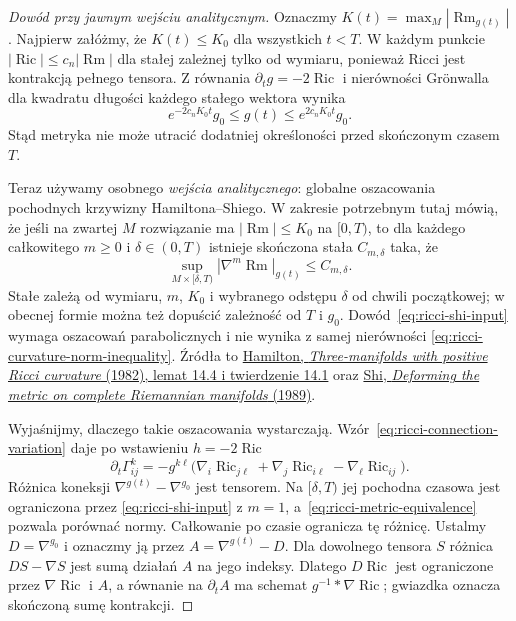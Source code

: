 \begin{proof}[Dowód przy jawnym wejściu analitycznym]
Oznaczmy
$K(t)=\max_M|\operatorname{Rm}_{g(t)}|$.
Najpierw załóżmy, że
$K(t)\leq K_0$ dla wszystkich $t<T$.
W każdym punkcie $|\operatorname{Ric}|
\leq c_n|\operatorname{Rm}|$ dla stałej zależnej
tylko od wymiaru, ponieważ Ricci jest kontrakcją
pełnego tensora. Z równania $\partial_tg=-2\operatorname{Ric}$
i nierówności Grönwalla dla kwadratu długości
każdego stałego wektora wynika
\begin{equation}\label{eq:ricci-metric-equivalence}
 e^{-2c_nK_0t}g_0
 \leq g(t)\leq e^{2c_nK_0t}g_0.
\end{equation}
Stąd metryka nie może utracić dodatniej określoności
przed skończonym czasem $T$.

Teraz używamy osobnego \emph{wejścia analitycznego}:
globalne oszacowania pochodnych krzywizny
Hamiltona--Shiego. W zakresie potrzebnym tutaj mówią,
że jeśli na zwartej $M$ rozwiązanie ma
$|\operatorname{Rm}|\leq K_0$ na $[0,T)$, to dla
każdego całkowitego $m\geq0$ i $\delta\in(0,T)$
istnieje skończona stała $C_{m,\delta}$ taka, że
\begin{equation}\label{eq:ricci-shi-input}
 \sup_{M\times[\delta,T)}
   |\nabla^m\operatorname{Rm}|_{g(t)}
   \leq C_{m,\delta}.
\end{equation}
Stałe zależą od wymiaru, $m$, $K_0$ i wybranego
odstępu $\delta$ od chwili początkowej; w obecnej
formie można też dopuścić zależność od $T$
i $g_0$. Dowód~\eqref{eq:ricci-shi-input}
wymaga oszacowań parabolicznych i nie wynika
z samej nierówności
\eqref{eq:ricci-curvature-norm-inequality}.
Źródła to
\href{https://projecteuclid.org/journals/journal-of-differential-geometry/volume-17/issue-2/Three-manifolds-with-positive-Ricci-curvature/10.4310/jdg/1214436922.pdf}
{Hamilton, \emph{Three-manifolds with positive Ricci
curvature} (1982), lemat 14.4 i twierdzenie 14.1}
oraz
\href{https://doi.org/10.4310/jdg/1214443292}
{Shi, \emph{Deforming the metric on complete
Riemannian manifolds} (1989)}.

Wyjaśnijmy, dlaczego takie oszacowania wystarczają.
Wzór~\eqref{eq:ricci-connection-variation} daje
po wstawieniu $h=-2\operatorname{Ric}$
\[
 \partial_t\Gamma^k_{ij}
 =-g^{k\ell}\bigl(
      \nabla_i\operatorname{Ric}_{j\ell}
     +\nabla_j\operatorname{Ric}_{i\ell}
     -\nabla_\ell\operatorname{Ric}_{ij}\bigr).
\]
Różnica koneksji $\nabla^{g(t)}-\nabla^{g_0}$
jest tensorem. Na $[\delta,T)$ jej pochodna
czasowa jest ograniczona przez
\eqref{eq:ricci-shi-input} z $m=1$,
a~\eqref{eq:ricci-metric-equivalence} pozwala
porównać normy. Całkowanie po czasie ogranicza
tę różnicę. Ustalmy $D=\nabla^{g_0}$ i oznaczmy ją
przez $A=\nabla^{g(t)}-D$. Dla dowolnego tensora $S$
różnica $DS-\nabla S$ jest sumą działań $A$ na jego
indeksy. Dlatego $D\operatorname{Ric}$ jest ograniczone
przez $\nabla\operatorname{Ric}$ i $A$, a równanie na
$\partial_tA$ ma schemat $g^{-1}*\nabla\operatorname{Ric}$;
gwiazdka oznacza skończoną sumę kontrakcji.


\end{proof}
